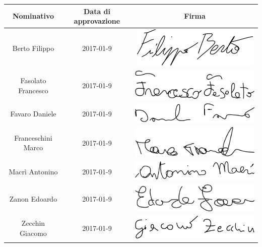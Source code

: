 \documentclass[../PianoProgetto.tex]{subfiles}
\begin{document}
		\begin{table}[h]
	
		\begin{tabularx}{\textwidth}{C C C}
			\toprule
			\textbf{Nominativo} & \textbf{Data di approvazione} & \textbf{Firma} \\
			\midrule
			Berto Filippo & 2017-01-9 & \includegraphics[scale=0.4]{Firme/fberto_firma} \\[1.2ex]
			Fasolato Francesco & 2017-01-9 & \includegraphics[scale=0.3]{Firme/ffasolato_firma} \\[1.2ex]
			Favaro Daniele & 2017-01-9 & \includegraphics[scale=0.3]{Firme/dfavaro_firma} \\[1.2ex]
			Franceschini Marco & 2017-01-9 &	\includegraphics[scale=0.4]{Firme/mfrances_firma} \\[1.2ex]
			Macrì Antonino & 2017-01-9 & \includegraphics[scale=0.3]{Firme/amacri_firma} \\[1.2ex]
			Zanon Edoardo & 2017-01-9 & \includegraphics[scale=0.3]{Firme/ezanon_firma} \\[1.2ex]
			Zecchin Giacomo & 2017-01-9 &	\includegraphics[scale=0.3]{Firme/gzecchin_firma} \\[1.2ex]
			\bottomrule
		\end{tabularx}
		
	\end{table}
	
\end{document}
